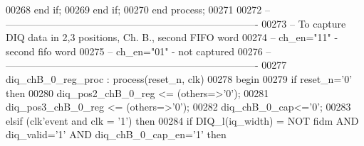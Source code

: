 \begin{DoxyCode}
00268             \textcolor{keywordflow}{end} \textcolor{keywordflow}{if}; 
00269         \textcolor{keywordflow}{end} \textcolor{keywordflow}{if};
00270     \textcolor{keywordflow}{end} \textcolor{keywordflow}{process};
00271 
00272 \textcolor{keyword}{-- ----------------------------------------------------------------------------}
00273 \textcolor{keyword}{-- To capture DIQ data in 2,3 positions, Ch. B., second FIFO word}
00274 \textcolor{keyword}{-- ch\_en="11" - second fifo word}
00275 \textcolor{keyword}{-- ch\_en="01" - not captured}
00276 \textcolor{keyword}{-- ----------------------------------------------------------------------------}
00277  diq\_chB\_0\_reg\_proc : \textcolor{keywordflow}{process}(reset_n, clk)
00278 \textcolor{vhdlkeyword}{    begin}
00279       \textcolor{keywordflow}{if} \textcolor{vhdlchar}{reset_n}\textcolor{vhdlchar}{=}\textcolor{vhdlchar}{'}\textcolor{vhdllogic}{}\textcolor{vhdllogic}{0}\textcolor{vhdlchar}{'} \textcolor{keywordflow}{then}
00280          \textcolor{vhdlchar}{diq_pos2_chB_0_reg} \textcolor{vhdlchar}{<=} \textcolor{vhdlchar}{(}\textcolor{keywordflow}{others}\textcolor{vhdlchar}{=}\textcolor{vhdlchar}{>}\textcolor{vhdlchar}{'}\textcolor{vhdllogic}{}\textcolor{vhdllogic}{0}\textcolor{vhdlchar}{'}\textcolor{vhdlchar}{)};
00281          \textcolor{vhdlchar}{diq_pos3_chB_0_reg} \textcolor{vhdlchar}{<=} \textcolor{vhdlchar}{(}\textcolor{keywordflow}{others}\textcolor{vhdlchar}{=}\textcolor{vhdlchar}{>}\textcolor{vhdlchar}{'}\textcolor{vhdllogic}{}\textcolor{vhdllogic}{0}\textcolor{vhdlchar}{'}\textcolor{vhdlchar}{)};
00282          \textcolor{vhdlchar}{diq_chB_0_cap}\textcolor{vhdlchar}{<=}\textcolor{vhdlchar}{'}\textcolor{vhdllogic}{}\textcolor{vhdllogic}{0}\textcolor{vhdlchar}{'};
00283       \textcolor{keywordflow}{elsif} \textcolor{vhdlchar}{(}\textcolor{vhdlchar}{clk}\textcolor{vhdlchar}{'}\textcolor{vhdlkeyword}{event} \textcolor{keywordflow}{and} \textcolor{vhdlchar}{clk} \textcolor{vhdlchar}{=} \textcolor{vhdlchar}{'}\textcolor{vhdllogic}{}\textcolor{vhdllogic}{1}\textcolor{vhdlchar}{'}\textcolor{vhdlchar}{)} \textcolor{keywordflow}{then}
00284             \textcolor{keywordflow}{if} \textcolor{vhdlchar}{DIQ_l}\textcolor{vhdlchar}{(}\textcolor{vhdlchar}{iq_width}\textcolor{vhdlchar}{)} \textcolor{vhdlchar}{=} \textcolor{keywordflow}{NOT} \textcolor{vhdlchar}{fidm} \textcolor{keywordflow}{AND} \textcolor{vhdlchar}{diq_valid}\textcolor{vhdlchar}{=}\textcolor{vhdlchar}{'}\textcolor{vhdllogic}{}\textcolor{vhdllogic}{1}\textcolor{vhdlchar}{'} \textcolor{keywordflow}{AND} \textcolor{vhdlchar}{diq_chB_0_cap_en}\textcolor{vhdlchar}{=}\textcolor{vhdlchar}{'}\textcolor{vhdllogic}{}\textcolor{vhdllogic}{1}\textcolor{vhdlchar}{'} \textcolor{keywordflow}{then} 

\end{DoxyCode}
